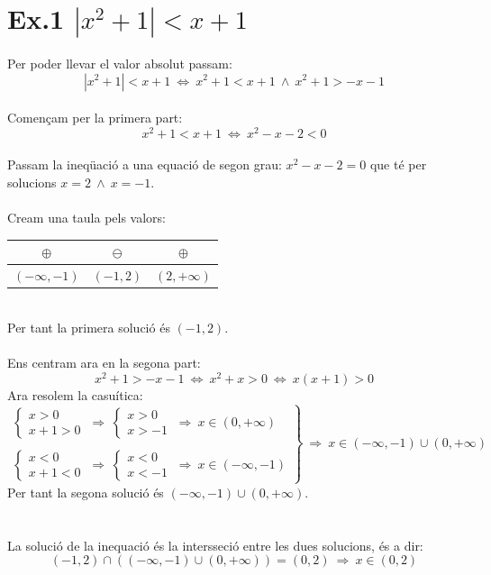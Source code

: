 
\section*{Ex.1 $|x^2+1|<x+1$}
Per poder llevar el valor absolut passam:
\begin{equation*}
|x^2+1|<x+1 \ \Longleftrightarrow \ x^2+1<x+1 \ \wedge \ x^2+1>-x-1
\end{equation*}
\\
Començam per la primera part:
\\
\begin{equation*}
x^2+1<x+1 \ \Leftrightarrow \ x^2-x-2<0 
\end{equation*}
\\
Passam la ineqüació a una equació de segon grau: $x^2-x-2=0$ que té per solucions $x=2 \ \wedge \ x=-1$. \\
\\
Cream una taula pels valors:
\begin{table}[h!]
\begin{center}
\begin{tabular}{c|c|c}
$\oplus$ & $\ominus$ & $\oplus$\\
\hline
$(-\infty,-1)$ & $(-1,2)$ & $(2,+\infty)$
\end{tabular}
\end{center}
\end{table}
\\
Per tant la primera solució és $(-1,2)$.
\\
\\
Ens centram ara en la segona part:
\begin{equation*}
x^2+1>-x-1 \ \Leftrightarrow \ x^2+x>0 \ \Leftrightarrow \ x(x+1)>0
\end{equation*}
Ara resolem la casuítica:
\begin{equation*}
\left.
\begin{array}{cc}
\left\lbrace
\begin{array}{cc}
x>0\\
x+1>0
\end{array}\right.
\ \Longrightarrow \
\left\lbrace
\begin{array}{cc}
x>0\\
x>-1
\end{array}\right.
\ \Longrightarrow \
x\in (0,+\infty)
\\
\\
\left\lbrace
\begin{array}{cc}
x<0\\
x+1<0
\end{array}\right.
\ \Longrightarrow \
\left\lbrace
\begin{array}{cc}
x<0\\
x<-1
\end{array}\right.
\ \Longrightarrow \
x\in(-\infty,-1)
\end{array}\right\rbrace
\ \Longrightarrow \
x\in(-\infty,-1)\cup(0,+\infty)
\end{equation*}
Per tant la segona solució és $(-\infty,-1)\cup(0,+\infty)$.
\\
\\
\\
La solució de la inequació és la intersseció entre les dues solucions, és a dir:
\begin{equation*}
(-1,2)\cap((-\infty,-1)\cup(0,+\infty))=(0,2) \ \Longrightarrow \ x\in(0,2)
\end{equation*}